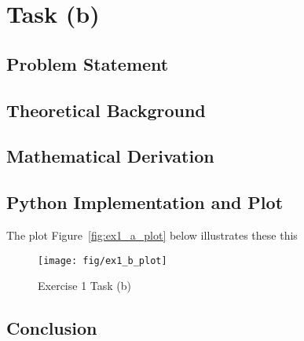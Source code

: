 \item[(b)]
\section*{Task (b)}

\subsection*{Problem Statement}

\subsection*{Theoretical Background}

\subsection*{Mathematical Derivation}

\subsection*{Python Implementation and Plot}
The plot Figure~\ref{fig:ex1_a_plot} below illustrates these this
\begin{figure}[h]
    \centering
    \texttt{[image: fig/ex1\_b\_plot]}
    \caption{Exercise 1 Task (b)}
    \label{fig:ex1_b_plot}
\end{figure}

\subsection*{Conclusion}